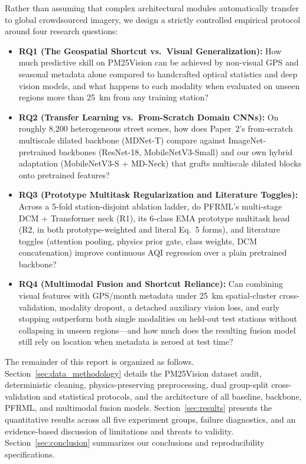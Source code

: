 \documentclass[conference]{IEEEtran}
\begin{document}
Rather than assuming that complex architectural modules automatically transfer
to global crowdsourced imagery, we design a strictly controlled empirical
protocol around four research questions:
\begin{itemize}
  \item \textbf{RQ1 (The Geospatial Shortcut vs.\ Visual Generalization):} How
        much predictive skill on PM25Vision can be achieved by non-visual GPS
        and seasonal metadata alone compared to handcrafted optical statistics
        and deep vision models, and what happens to each modality when evaluated
        on unseen regions more than 25~km from any training station?
  \item \textbf{RQ2 (Transfer Learning vs.\ From-Scratch Domain CNNs):} On
        roughly 8,200 heterogeneous street scenes, how does Paper~2's
        from-scratch multiscale dilated backbone (MDNet-T) compare against
        ImageNet-pretrained backbones (ResNet-18, MobileNetV3-Small) and our own
        hybrid adaptation (MobileNetV3-S + MD-Neck) that grafts multiscale
        dilated blocks onto pretrained features?
  \item \textbf{RQ3 (Prototype Multitask Regularization and Literature
        Toggles):} Across a 5-fold station-disjoint ablation ladder, do PFRML's
        multi-stage DCM + Transformer neck (R1), its 6-class EMA prototype
        multitask head (R2, in both prototype-weighted and literal Eq.~5 forms),
        and literature toggles (attention pooling, physics prior gate, class
        weights, DCM concatenation) improve continuous AQI regression over a
        plain pretrained backbone?
  \item \textbf{RQ4 (Multimodal Fusion and Shortcut Reliance):} Can combining
        visual features with GPS/month metadata under 25~km spatial-cluster
        cross-validation, modality dropout, a detached auxiliary vision loss,
        and early stopping outperform both single modalities on held-out test
        stations without collapsing in unseen regions---and how much does the
        resulting fusion model still rely on location when metadata is zeroed at
        test time?
\end{itemize}

The remainder of this report is organized as follows.
Section~\ref{sec:data_methodology} details the PM25Vision dataset audit,
deterministic cleaning, physics-preserving preprocessing, dual group-split
cross-validation and statistical protocols, and the architecture of all
baseline, backbone, PFRML, and multimodal fusion models.
Section~\ref{sec:results} presents the quantitative results across all five
experiment groups, failure diagnostics, and an evidence-based discussion of
limitations and threats to validity. Section~\ref{sec:conclusion} summarizes our
conclusions and reproducibility specifications.
\end{document}
